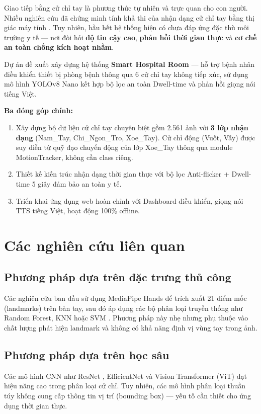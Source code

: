 \documentclass[conference]{IEEEtran}
\begin{document}
Giao tiếp bằng cử chỉ tay là phương thức tự nhiên và trực quan cho con người. Nhiều nghiên cứu đã chứng minh tính khả thi của nhận dạng cử chỉ tay bằng thị giác máy tính \cite{ref1}. Tuy nhiên, hầu hết hệ thống hiện có chưa đáp ứng đặc thù môi trường y tế --- nơi đòi hỏi \textbf{độ tin cậy cao}, \textbf{phản hồi thời gian thực} và \textbf{cơ chế an toàn chống kích hoạt nhầm}.

Dự án đề xuất xây dựng hệ thống \textbf{Smart Hospital Room} --- hỗ trợ bệnh nhân điều khiển thiết bị phòng bệnh thông qua 6 cử chỉ tay không tiếp xúc, sử dụng mô hình YOLOv8 Nano \cite{ref7} kết hợp bộ lọc an toàn Dwell-time và phản hồi giọng nói tiếng Việt.

\textbf{Ba đóng góp chính:}
\begin{enumerate}[noitemsep]
    \item Xây dựng bộ dữ liệu cử chỉ tay chuyên biệt gồm 2.561 ảnh với \textbf{3 lớp nhận dạng} (Nam\_Tay, Chi\_Ngon\_Tro, Xoe\_Tay). Cử chỉ động (Vuốt, Vẫy) được suy diễn từ quỹ đạo chuyển động của lớp Xoe\_Tay thông qua module MotionTracker, không cần class riêng.
    \item Thiết kế kiến trúc nhận dạng thời gian thực với bộ lọc Anti-flicker + Dwell-time 5 giây đảm bảo an toàn y tế.
    \item Triển khai ứng dụng web hoàn chỉnh với Dashboard điều khiển, giọng nói TTS tiếng Việt, hoạt động 100\% offline.
\end{enumerate}

\section{Các nghiên cứu liên quan}

\subsection{Phương pháp dựa trên đặc trưng thủ công}
Các nghiên cứu ban đầu sử dụng MediaPipe Hands để trích xuất 21 điểm mốc (landmarks) trên bàn tay, sau đó áp dụng các bộ phân loại truyền thống như Random Forest, KNN hoặc SVM \cite{ref1}. Phương pháp này nhẹ nhưng phụ thuộc vào chất lượng phát hiện landmark và không có khả năng định vị vùng tay trong ảnh.

\subsection{Phương pháp dựa trên học sâu}
Các mô hình CNN như ResNet \cite{ref9}, EfficientNet và Vision Transformer (ViT) \cite{ref5} đạt hiệu năng cao trong phân loại cử chỉ. Tuy nhiên, các mô hình phân loại thuần túy không cung cấp thông tin vị trí (bounding box) --- yếu tố cần thiết cho ứng dụng thời gian thực.
\end{document}
